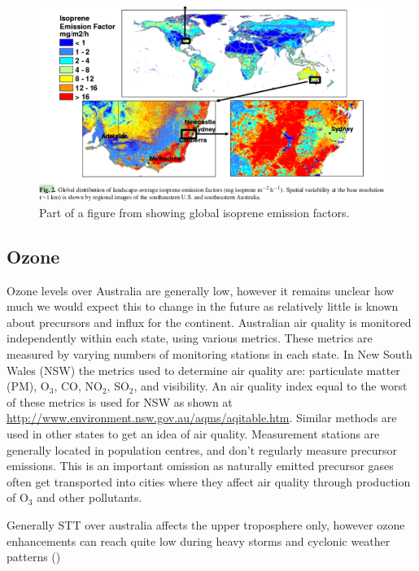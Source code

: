   \begin{figure}
    \includegraphics[width=\textwidth]{Figures/MeganIsoprene1.png}
    \caption{ Part of a figure from \cite{Guenther2006} showing global isoprene emission factors. }
    \label{LR:Aus:fig_MEGAN_EF}
  \end{figure}
  
  
  \subsection{Ozone}
    Ozone levels over Australia are generally low, however it remains unclear how much we would expect this to change in the future as relatively little is known about precursors and influx for the continent.
    Australian air quality is monitored independently within each state, using various metrics. These metrics are measured by varying numbers of monitoring stations in each state.
    In New South Wales (NSW) the metrics used to determine air quality are: particulate matter (PM), O$_3$, CO, NO$_2$, SO$_2$, and visibility.
    An air quality index equal to the worst of these metrics is used for NSW as shown at \url{http://www.environment.nsw.gov.au/aqms/aqitable.htm}.
    Similar methods are used in other states to get an idea of air quality.
    Measurement stations are generally located in population centres, and don't regularly measure precursor emissions. 
    This is an important omission as naturally emitted precursor gases often get transported into cities where they affect air quality through production of O$_3$ and other pollutants.
    
    Generally STT over australia affects the upper troposphere only, however ozone enhancements can reach quite low during heavy storms and cyclonic weather patterns (\cite{Alexander2013})
  
